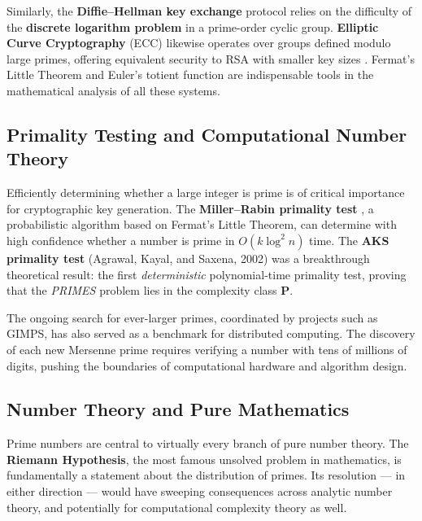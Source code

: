 \documentclass[11pt]{article}
\theoremstyle{plain}
\theoremstyle{definition}
\theoremstyle{remark}
\begin{document}
\par Similarly, the \textbf{Diffie--Hellman key exchange} protocol \cite{diffie_hellman_1976} relies on the difficulty of the \textbf{discrete logarithm problem} in a prime-order cyclic group. \textbf{Elliptic Curve Cryptography} (ECC) likewise operates over groups defined modulo large primes, offering equivalent security to RSA with smaller key sizes \cite{koblitz_crypto_1994}. Fermat's Little Theorem and Euler's totient function are indispensable tools in the mathematical analysis of all these systems.

\subsection{Primality Testing and Computational Number Theory}

\par Efficiently determining whether a large integer is prime is of critical importance for cryptographic key generation. The \textbf{Miller--Rabin primality test} \cite{miller_rabin_1980}, a probabilistic algorithm based on Fermat's Little Theorem, can determine with high confidence whether a number is prime in $O(k \log^2 n)$ time. The \textbf{AKS primality test} \cite{aks_2004} (Agrawal, Kayal, and Saxena, 2002) was a breakthrough theoretical result: the first \textit{deterministic} polynomial-time primality test, proving that the \textit{PRIMES} problem lies in the complexity class $\textbf{P}$.

\par The ongoing search for ever-larger primes, coordinated by projects such as GIMPS, has also served as a benchmark for distributed computing. The discovery of each new Mersenne prime requires verifying a number with tens of millions of digits, pushing the boundaries of computational hardware and algorithm design.

\subsection{Number Theory and Pure Mathematics}

\par Prime numbers are central to virtually every branch of pure number theory. The \textbf{Riemann Hypothesis}, the most famous unsolved problem in mathematics, is fundamentally a statement about the distribution of primes. Its resolution — in either direction — would have sweeping consequences across analytic number theory, and potentially for computational complexity theory as well.
\end{document}
